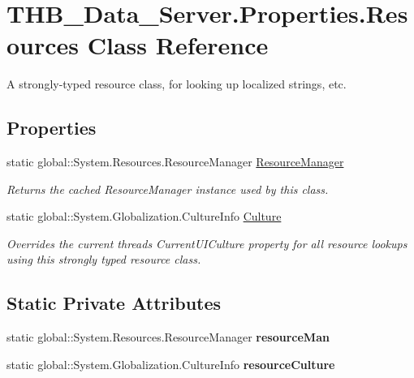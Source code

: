 \hypertarget{class_t_h_b___data___server_1_1_properties_1_1_resources}{}\section{T\+H\+B\+\_\+\+Data\+\_\+\+Server.\+Properties.\+Resources Class Reference}
\label{class_t_h_b___data___server_1_1_properties_1_1_resources}


A strongly-\/typed resource class, for looking up localized strings, etc.  


\subsection*{Properties}
\begin{DoxyCompactItemize}
\item 
static global\+::\+System.\+Resources.\+Resource\+Manager \mbox{\hyperlink{class_t_h_b___data___server_1_1_properties_1_1_resources_a1e2436decacf2127dc5f33a45302bb1a}{Resource\+Manager}}
\begin{DoxyCompactList}\small\item\em Returns the cached Resource\+Manager instance used by this class. \end{DoxyCompactList}\item 
static global\+::\+System.\+Globalization.\+Culture\+Info \mbox{\hyperlink{class_t_h_b___data___server_1_1_properties_1_1_resources_a0f9c72f240b5984d2407f2bab6d3372a}{Culture}}
\begin{DoxyCompactList}\small\item\em Overrides the current thread\textquotesingle{}s Current\+U\+I\+Culture property for all resource lookups using this strongly typed resource class. \end{DoxyCompactList}\end{DoxyCompactItemize}
\subsection*{Static Private Attributes}
\begin{DoxyCompactItemize}
\item 
\mbox{\label{class_t_h_b___data___server_1_1_properties_1_1_resources_a713fd57fd8801c7746351c27854346b3}} 
static global\+::\+System.\+Resources.\+Resource\+Manager {\bfseries resource\+Man}
\item 
\mbox{\label{class_t_h_b___data___server_1_1_properties_1_1_resources_ae464ad6fd5de501271de18f45ad08573}} 
static global\+::\+System.\+Globalization.\+Culture\+Info {\bfseries resource\+Culture}
\end{DoxyCompactItemize}


